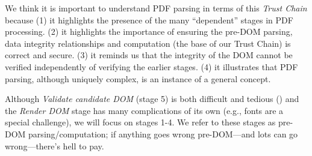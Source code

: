 We think it is important to understand PDF parsing in terms of this
\emph{Trust Chain} because
%
(1) it highlights the presence of the many ``dependent'' stages
in PDF processing.
%
(2) it highlights the importance of ensuring the pre-DOM parsing, data integrity relationships and
computation (the base of our Trust Chain) is correct and secure.
%
(3) it reminds us that the integrity of the DOM cannot be verified
independently of verifying the earlier stages.
%
(4) it illustrates that PDF parsing, although uniquely complex, is an instance of
a general concept.

Although \emph{Validate candidate DOM} (stage 5) is both difficult and tedious
()
and the \emph{Render DOM} stage has many complications of its own (e.g., fonts are
a special challenge), we will focus on stages 1-4.
We refer to these stages as pre-DOM parsing/computation; if anything
goes wrong pre-DOM---and lots can go wrong---there's hell to pay. 
